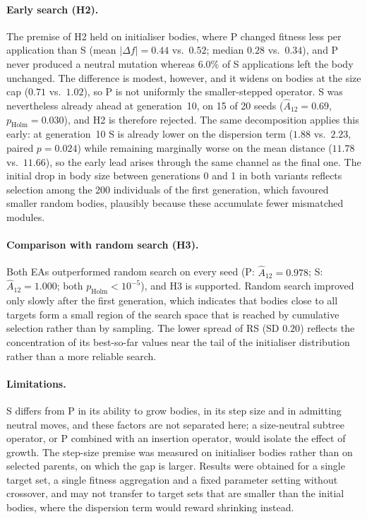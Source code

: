 \documentclass[sigconf]{acmart}
\begin{document}
\paragraph{Early search (H2).}
The premise of H2 held on initialiser bodies, where P changed fitness less per application than S (mean $|\Delta f| = 0.44$ vs.\ $0.52$; median $0.28$ vs.\ $0.34$), and P never produced a neutral mutation whereas $6.0\%$ of S applications left the body unchanged.
The difference is modest, however, and it widens on bodies at the size cap ($0.71$ vs.\ $1.02$), so P is not uniformly the smaller-stepped operator.
S was nevertheless already ahead at generation~10, on 15 of 20 seeds ($\hat{A}_{12} = 0.69$, $p_\text{Holm} = 0.030$), and H2 is therefore rejected.
The same decomposition applies this early: at generation~10 S is already lower on the dispersion term ($1.88$ vs.\ $2.23$, paired $p = 0.024$) while remaining marginally worse on the mean distance ($11.78$ vs.\ $11.66$), so the early lead arises through the same channel as the final one.
The initial drop in body size between generations 0 and 1 in both variants reflects selection among the 200 individuals of the first generation, which favoured smaller random bodies, plausibly because these accumulate fewer mismatched modules.

\paragraph{Comparison with random search (H3).}
Both EAs outperformed random search on every seed (P: $\hat{A}_{12} = 0.978$; S: $\hat{A}_{12} = 1.000$; both $p_\text{Holm} < 10^{-5}$), and H3 is supported.
Random search improved only slowly after the first generation, which indicates that bodies close to all targets form a small region of the search space that is reached by cumulative selection rather than by sampling.
The lower spread of RS (SD $0.20$) reflects the concentration of its best-so-far values near the tail of the initialiser distribution rather than a more reliable search.

\paragraph{Limitations.}
S differs from P in its ability to grow bodies, in its step size and in admitting neutral moves, and these factors are not separated here; a size-neutral subtree operator, or P combined with an insertion operator, would isolate the effect of growth.
The step-size premise was measured on initialiser bodies rather than on selected parents, on which the gap is larger.
Results were obtained for a single target set, a single fitness aggregation and a fixed parameter setting without crossover, and may not transfer to target sets that are smaller than the initial bodies, where the dispersion term would reward shrinking instead.
\end{document}
